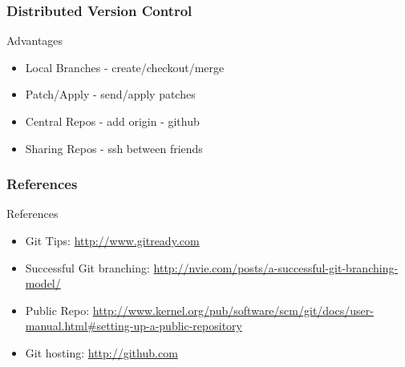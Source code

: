 \documentclass[10pt]{beamer}
\begin{document}
\begin{frame}
    \frametitle{Distributed Version Control}
    \begin{block}{Advantages}
        \begin{itemize}
            \item Local Branches - create/checkout/merge
            \item Patch/Apply - send/apply patches
            \item Central Repos - add origin - github
            \item Sharing Repos - ssh between friends
        \end{itemize}
    \end{block}
\end{frame}


\begin{frame}
    \frametitle{References}
    \begin{block}{References}
        \begin{itemize}
            \item Git Tips: \url{http://www.gitready.com}
            \item Successful Git branching: \url{http://nvie.com/posts/a-successful-git-branching-model/}
            \item Public Repo: \url{http://www.kernel.org/pub/software/scm/git/docs/user-manual.html\#setting-up-a-public-repository}
            \item Git hosting: \url{http://github.com}
        \end{itemize}
    \end{block}
\end{frame}
\end{document}
